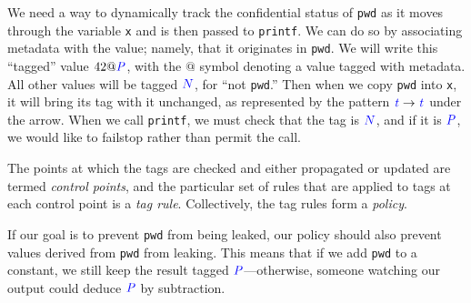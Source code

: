 \documentclass{llncs}
\begin{document}

We need a way to dynamically track the confidential status of {\tt pwd} as it moves through the variable
{\tt x} and is then passed to {\tt printf}. We can do so by associating metadata with the
value; namely, that it originates in {\tt pwd}. We will write this ``tagged'' value \(42 @ \mathit{\color{blue} P}\),
with the \(@\) symbol denoting a value tagged with metadata.
All other values will be tagged \({\color{blue} N}\), for ``not {\tt pwd}.''
Then when we copy {\tt pwd} into {\tt x}, it will bring its tag with it unchanged,
as represented by the pattern \(\mathit{\color{blue} t} \rightarrow \mathit{\color{blue} t}\) under the arrow.
When we call {\tt printf}, we must check that the tag is \({\color{blue} N}\), and if it is
\(\mathit{\color{blue} P}\), we would like to failstop rather than permit the call.



The points at which the tags are checked and either propagated or updated are termed
{\em control points}, and the particular set of rules that are applied to tags at each
control point is a {\em tag rule}. Collectively, the tag rules form a {\em policy}.

If our goal is to prevent {\tt pwd} from being leaked, our policy should also prevent
values derived from {\tt pwd} from leaking. This means that if we add {\tt pwd} to a
constant, we still keep the result tagged \(\mathit{\color{blue} P}\)---otherwise, someone watching our output
could deduce \(\mathit{\color{blue} P}\) by subtraction.
\end{document}
